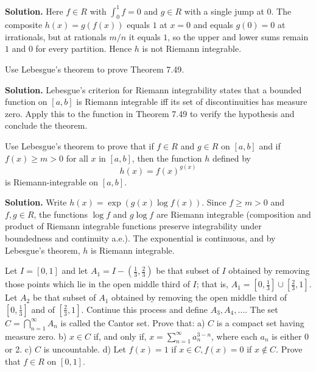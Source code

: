 \noindent\textbf{Solution.}
Here $f\in R$ with $\int_0^1 f=0$ and $g\in R$ with a single jump at $0$. The composite $h(x)=g(f(x))$ equals $1$ at $x=0$ and equals $g(0)=0$ at irrationals, but at rationals $m/n$ it equals $1$, so the upper and lower sums remain $1$ and $0$ for every partition. Hence $h$ is not Riemann integrable.
\medskip

\begin{problembox}
Use Lebesgue's theorem to prove Theorem 7.49.
\end{problembox}

\noindent\textbf{Solution.}
Lebesgue's criterion for Riemann integrability states that a bounded function on $[a,b]$ is Riemann integrable iff its set of discontinuities has measure zero. Apply this to the function in Theorem 7.49 to verify the hypothesis and conclude the theorem.
\medskip

\begin{problembox}
Use Lebesgue's theorem to prove that if $f \in R$ and $g \in R$ on $[a, b]$ and if $f(x) \geq m > 0$ for all $x$ in $[a, b]$, then the function $h$ defined by
\[h(x) = f(x)^{g(x)}\]
is Riemann-integrable on $[a, b]$.
\end{problembox}

\noindent\textbf{Solution.}
Write $h(x)=\exp(g(x)\log f(x))$. Since $f\ge m>0$ and $f,g\in R$, the functions $\log f$ and $g\log f$ are Riemann integrable (composition and product of Riemann integrable functions preserve integrability under boundedness and continuity a.e.). The exponential is continuous, and by Lebesgue's theorem, $h$ is Riemann integrable.
\medskip

\begin{problembox}
Let $I = [0, 1]$ and let $A_1 = I - (\frac{1}{3}, \frac{2}{3})$ be that subset of $I$ obtained by removing those points which lie in the open middle third of $I$; that is, $A_1 = [0, \frac{1}{3}] \cup [\frac{2}{3}, 1]$. Let $A_2$ be that subset of $A_1$ obtained by removing the open middle third of $[0, \frac{1}{3}]$ and of $[\frac{2}{3}, 1]$. Continue this process and define $A_3, A_4, \ldots$. The set $C = \bigcap_{n=1}^{\infty} A_n$ is called the Cantor set. Prove that:
a) $C$ is a compact set having measure zero.
b) $x \in C$ if, and only if, $x = \sum_{n=1}^{\infty} a_n^{3-n}$, where each $a_n$ is either 0 or 2.
c) $C$ is uncountable.
d) Let $f(x) = 1$ if $x \in C, f(x) = 0$ if $x \notin C$. Prove that $f \in R$ on $[0, 1]$.
\end{problembox}

